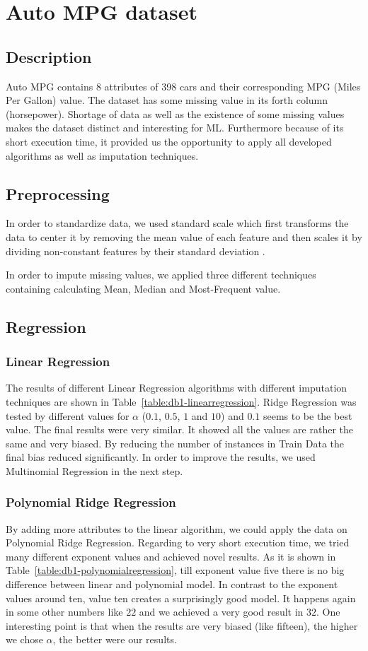 \section{Auto MPG dataset}
\subsection{Description}
Auto MPG contains 8 attributes of 398 cars  and their corresponding MPG (Miles Per Gallon) value. The dataset has some missing value in its forth column (horsepower). Shortage of data as well as the existence of some missing values makes the dataset distinct and interesting for ML. Furthermore because of its short execution time, it provided us the opportunity to apply all developed algorithms as well as imputation techniques.

\subsection{Preprocessing}
In order to standardize data, we used standard scale which first transforms the data to center it by removing the mean value of each feature and then scales it by dividing non-constant features by their standard deviation \cite{scikitstandardization}.

In order to impute missing values, we applied three different techniques containing calculating Mean, Median and Most-Frequent value.

\subsection{Regression}
\subsubsection{Linear Regression}
The results of different Linear Regression algorithms with different imputation techniques are shown in Table~\ref{table:db1-linearregression}. Ridge Regression was tested by different values for $\alpha$ ($0.1$, $0.5$, $1$ and $10$) and $0.1$ seems to be the best value. The final results were very similar. It showed all the values are rather the same and very biased. By reducing the number of instances in Train Data the final bias reduced significantly. In order to improve the results, we used Multinomial Regression in the next step.

\subsubsection{Polynomial Ridge Regression}
By adding more attributes to the linear algorithm, we could apply the data on Polynomial Ridge Regression. Regarding to very short execution time, we tried many different exponent values and achieved novel results. As it is shown in Table~\ref{table:db1-polynomialregression}, till exponent value five there is no big difference between linear and polynomial model. In contrast to the exponent values around ten, value ten creates a surprisingly good model. It happens again in some other numbers like $22$ and we achieved a very good result in $32$. One interesting point is that when the results are very biased (like fifteen), the higher we chose $\alpha$, the better were our results.

